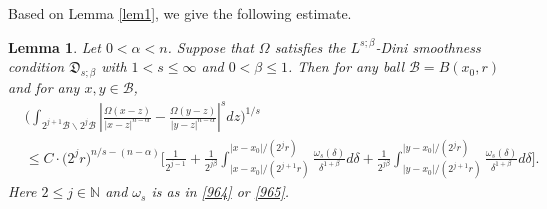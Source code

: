\documentclass[preprint,10pt]{elsarticle}
\newtheorem{lem}[thm]{Lemma}
\numberwithin{equation}{section}
\begin{document}
Based on Lemma \ref{lem1}, we give the following estimate.
\begin{lem}\label{lem3}
Let $0<\alpha<n$. Suppose that $\Omega$ satisfies the $L^{s;\beta}$-Dini smoothness condition $\mathfrak{D}_{s;\beta}$ with $1<s\le\infty$ and $0<\beta\leq1$. Then for any ball $\mathcal{B}=B(x_0,r)$ and for any $x,y\in \mathcal{B}$,
\begin{equation}\label{wewant0}
\begin{split}
&\bigg(\int_{2^{j+1}\mathcal{B}\backslash 2^j\mathcal{B}}
\left|\frac{\Omega(x-z)}{|x-z|^{n-\alpha}}-\frac{\Omega(y-z)}{|y-z|^{n-\alpha}}\right|^sdz\bigg)^{1/s}\\
&\leq C\cdot\big(2^jr\big)^{n/s-(n-\alpha)}
\bigg[\frac{1}{2^{j-1}}+\frac{1}{2^{j\beta}}
\int_{|x-x_0|/{(2^{j+1}r)}}^{|x-x_0|/{(2^jr)}}\frac{\omega_s(\delta)}{\delta^{1+\beta}}d\delta
+\frac{1}{2^{j\beta}}
\int_{|y-x_0|/{(2^{j+1}r)}}^{|y-x_0|/{(2^jr)}}\frac{\omega_s(\delta)}{\delta^{1+\beta}}d\delta\bigg].
\end{split}
\end{equation}
Here $2\leq j\in \mathbb{N}$ and $\omega_s$ is as in \eqref{964} or \eqref{965}.
\end{lem}
\end{document}
